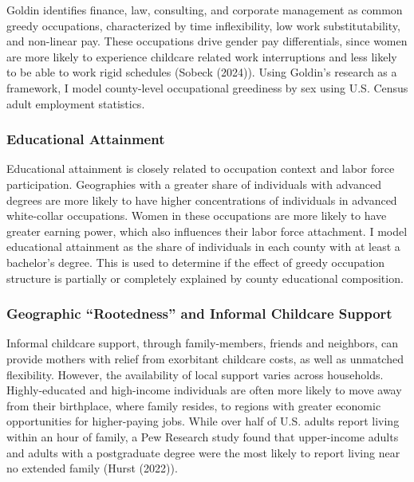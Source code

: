 \documentclass[
  letterpaper,
  DIV=11,
  numbers=noendperiod]{scrartcl}
\begin{document}
Goldin identifies finance, law, consulting, and corporate management as
common greedy occupations, characterized by time inflexibility, low work
substitutability, and non-linear pay. These occupations drive gender pay
differentials, since women are more likely to experience childcare
related work interruptions and less likely to be able to work rigid
schedules (Sobeck (2024)). Using Goldin's research as a framework, I
model county-level occupational greediness by sex using U.S. Census
adult employment statistics.

\subsubsection{Educational Attainment}\label{educational-attainment}

Educational attainment is closely related to occupation context and
labor force participation. Geographies with a greater share of
individuals with advanced degrees are more likely to have higher
concentrations of individuals in advanced white-collar occupations.
Women in these occupations are more likely to have greater earning
power, which also influences their labor force attachment. I model
educational attainment as the share of individuals in each county with
at least a bachelor's degree. This is used to determine if the effect of
greedy occupation structure is partially or completely explained by
county educational composition.

\subsubsection{Geographic ``Rootedness'' and Informal Childcare
Support}\label{geographic-rootedness-and-informal-childcare-support}

Informal childcare support, through family-members, friends and
neighbors, can provide mothers with relief from exorbitant childcare
costs, as well as unmatched flexibility. However, the availability of
local support varies across households. Highly-educated and high-income
individuals are often more likely to move away from their birthplace,
where family resides, to regions with greater economic opportunities for
higher-paying jobs. While over half of U.S. adults report living within
an hour of family, a Pew Research study found that upper-income adults
and adults with a postgraduate degree were the most likely to report
living near no extended family (Hurst (2022)).
\end{document}
